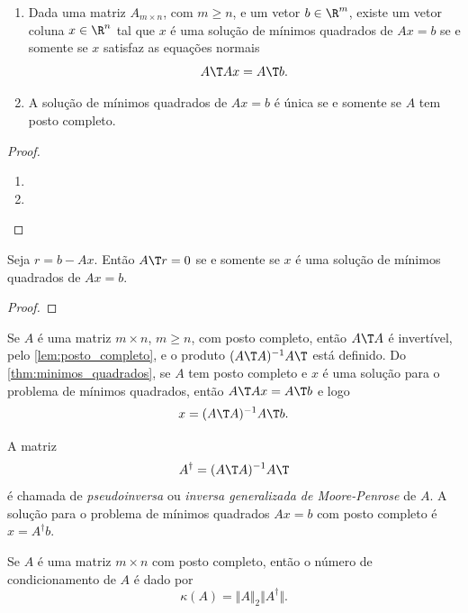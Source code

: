 \documentclass{article}
\begin{document}
\begin{thm}\label{thm:minimos_quadrados}
    \begin{enumerate}
        \item [a.] Dada uma matriz \(A_{m \times n}\), com \(m \geq n\), e um vetor \(b \in \R^m\), existe um vetor coluna \(x \in \R^n\) tal que \(x\) é uma solução de mínimos quadrados de \(Ax=b\) se e somente se \(x\) satisfaz as equações normais
        \[
            A\T Ax = A\T b.
        \]
        \item [b.] A solução de mínimos quadrados de \(Ax=b\) é única se e somente se \(A\) tem posto completo.
    \end{enumerate}
\end{thm}

\begin{proof}
    \begin{enumerate}
        \item [a.] 
        \item [b.] 
    \end{enumerate}
\end{proof}

\begin{thm} 
    Seja \(r = b - Ax\). Então \(A\T r = 0\) se e somente se \(x\) é uma solução de mínimos quadrados de \(Ax=b\).
\end{thm}

\begin{proof}
    
\end{proof}

Se \(A\) é uma matriz \(m \times n\), \(m \geq n\), com posto completo, então \(A\T A\) é invertível, pelo \autoref{lem:posto_completo}, e o produto \((A\T A)^{-1}A\T \) está definido. Do \autoref{thm:minimos_quadrados}, se \(A\) tem posto completo e \(x\) é uma solução para o problema de mínimos quadrados, então \(A\T Ax = A\T b\) e logo
\[
    x = (A\T A)^{-1}A\T b.
\]

\begin{defn}
    A matriz
    \begin{equation}
        A^{\dagger} = (A\T A)^{-1}A\T 
    \end{equation}
    é chamada de \emph{pseudoinversa} ou \emph{inversa generalizada de Moore-Penrose} de \(A\). A solução para o problema de mínimos quadrados \(Ax=b\) com posto completo é \(x = A^{\dagger}b\).
\end{defn}

\begin{defn}
    Se \(A\) é uma matriz \(m \times n\) com posto completo, então o número de condicionamento de \(A\) é dado por
    \begin{equation}
        \kappa(A) = \Vert A \Vert_2 \Vert A^{\dagger} \Vert.
    \end{equation}
\end{defn}
\end{document}
